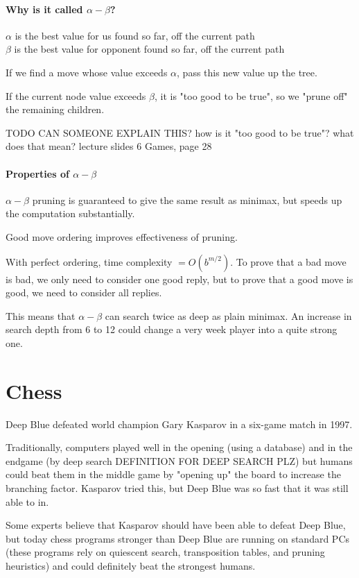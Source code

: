 \paragraph{Why is it called $\alpha-\beta$?}
$\alpha$ is the best value for us found so far, off the current path\\
$\beta$ is the best value for opponent found so far, off the current path

If we find a move whose value exceeds $\alpha$, pass this new value up the
tree.

If the current node value exceeds $\beta$, it is "too good to be true", so we
"prune off" the remaining children.

TODO CAN SOMEONE EXPLAIN THIS? how is it "too good to be true"? what does that mean?
lecture slides 6 Games, page 28

\paragraph{Properties of $\alpha-\beta$}
$\alpha-\beta$ pruning is guaranteed to give the same result as minimax, but
speeds up the computation substantially.

Good move ordering improves effectiveness of pruning.

With perfect ordering, time complexity $= O(b^{m/2})$. To prove that a bad move
is bad, we only need to consider one good reply, but to prove that a good move
is good, we need to consider all replies.

This means that $\alpha-\beta$ can search twice as deep as plain minimax. An
increase in search depth from 6 to 12 could change a very week player into a
quite strong one.

\section{Chess}
Deep Blue defeated world champion Gary Kasparov in a six-game match in 1997.

Traditionally, computers played well in the opening (using a database) and in
the endgame (by deep search DEFINITION FOR DEEP SEARCH PLZ) but humans could
beat them in the middle game by "opening up" the board to increase the
branching factor. Kasparov tried this, but Deep Blue was so fast that it was
still able to in.

Some experts believe that Kasparov should have been able to defeat Deep Blue,
but today chess programs stronger than Deep Blue are running on standard PCs
(these programs rely on quiescent search, transposition tables, and pruning
heuristics) and could definitely beat the strongest humans.


